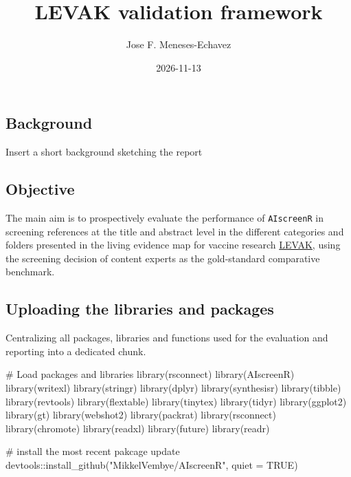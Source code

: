 \documentclass[
  letterpaper,
  DIV=11,
  numbers=noendperiod]{scrartcl}
\title{LEVAK validation framework}
\author{Jose F. Meneses-Echavez}
\date{2026-11-13}
\newenvironment{Shaded}{\begin{snugshade}}{\end{snugshade}}
\newcommand{\AttributeTok}[1]{\textcolor[rgb]{0.40,0.45,0.13}{#1}}
\newcommand{\CommentTok}[1]{\textcolor[rgb]{0.37,0.37,0.37}{#1}}
\newcommand{\ConstantTok}[1]{\textcolor[rgb]{0.56,0.35,0.01}{#1}}
\newcommand{\FunctionTok}[1]{\textcolor[rgb]{0.28,0.35,0.67}{#1}}
\newcommand{\NormalTok}[1]{\textcolor[rgb]{0.00,0.23,0.31}{#1}}
\newcommand{\SpecialCharTok}[1]{\textcolor[rgb]{0.37,0.37,0.37}{#1}}
\newcommand{\StringTok}[1]{\textcolor[rgb]{0.13,0.47,0.30}{#1}}
\begin{document}
\maketitle


\subsection{Background}\label{background}

Insert a short background sketching the report

\subsection{Objective}\label{objective}

The main aim is to prospectively evaluate the performance of
\texttt{AIscreenR} in screening references at the title and abstract
level in the different categories and folders presented in the living
evidence map for vaccine research
\href{https://github.com/jmeneses90/LEVAK}{LEVAK}, using the screening
decision of content experts as the gold-standard comparative benchmark.

\subsection{Uploading the libraries and
packages}\label{uploading-the-libraries-and-packages}

Centralizing all packages, libraries and functions used for the
evaluation and reporting into a dedicated chunk.

\begin{Shaded}
\begin{Highlighting}[]
\CommentTok{\# Load packages and libraries}
\FunctionTok{library}\NormalTok{(rsconnect)}
\FunctionTok{library}\NormalTok{(AIscreenR)}
\FunctionTok{library}\NormalTok{(writexl)}
\FunctionTok{library}\NormalTok{(stringr)}
\FunctionTok{library}\NormalTok{(dplyr)}
\FunctionTok{library}\NormalTok{(synthesisr)}
\FunctionTok{library}\NormalTok{(tibble)}
\FunctionTok{library}\NormalTok{(revtools)}
\FunctionTok{library}\NormalTok{(flextable)}
\FunctionTok{library}\NormalTok{(tinytex)}
\FunctionTok{library}\NormalTok{(tidyr)}
\FunctionTok{library}\NormalTok{(ggplot2)}
\FunctionTok{library}\NormalTok{(gt)}
\FunctionTok{library}\NormalTok{(webshot2)}
\FunctionTok{library}\NormalTok{(packrat)}
\FunctionTok{library}\NormalTok{(rsconnect)}
\FunctionTok{library}\NormalTok{(chromote)}
\FunctionTok{library}\NormalTok{(readxl)}
\FunctionTok{library}\NormalTok{(future)}
\FunctionTok{library}\NormalTok{(readr)}

\CommentTok{\# install the most recent pakcage update}
\NormalTok{devtools}\SpecialCharTok{::}\FunctionTok{install\_github}\NormalTok{(}\StringTok{"MikkelVembye/AIscreenR"}\NormalTok{, }\AttributeTok{quiet =} \ConstantTok{TRUE}\NormalTok{)}
\end{Highlighting}
\end{Shaded}
\end{document}
